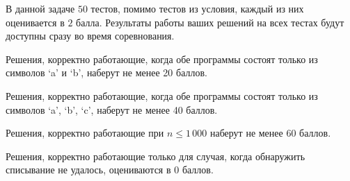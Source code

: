 В данной задаче $50$ тестов, помимо тестов из условия, каждый из них оценивается в $2$ балла. Результаты работы ваших решений на всех тестах будут доступны сразу во время соревнования. 

Решения, корректно работающие, когда обе программы состоят только из символов `a' и `b', наберут не менее 20 баллов.

Решения, корректно работающие, когда обе программы состоят только из символов `a', `b', `c', наберут не менее 40 баллов.

Решения, корректно работающие при $n \leqslant 1\,000$ наберут не менее 60 баллов.

Решения, корректно работающие только для случая, когда обнаружить списывание не удалось, оцениваются в 0 баллов.



